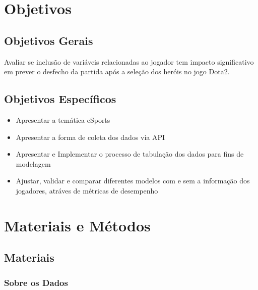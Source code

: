 \documentclass[
12pt,				%
openright,			%
oneside,			%
a4paper,			%
english,			%
brazil,				%
]{abntex2}
\begin{document}
\chapter{Objetivos}

\section{Objetivos Gerais}

Avaliar se inclusão de variáveis relacionadas ao jogador tem impacto
significativo em prever o desfecho da partida após a seleção dos heróis no
jogo Dota2.

\section{Objetivos Específicos}

\begin{itemize}
\item Apresentar a temática eSports

\item Apresentar a forma de coleta dos dados via API

\item Apresentar e Implementar o processo de tabulação dos dados para fins de
modelagem

\item Ajustar, validar e comparar diferentes modelos com e sem a informação dos
jogadores, atráves de métricas de desempenho

\end{itemize}

\chapter{Materiais e Métodos}
\label{cha:materiaisemetodos}

\section{Materiais}
\label{sec:materiais}

\subsection{Sobre os Dados}
\end{document}
